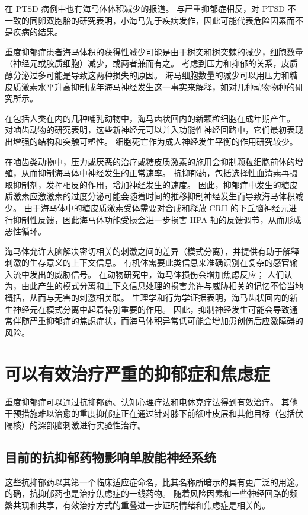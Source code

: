 在 PTSD 病例中也有海马体体积减少的报道。 与严重抑郁症相反，对 PTSD 不一致的同卵双胞胎的研究表明，小海马先于疾病发作，因此可能代表危险因素而不是疾病的结果。

重度抑郁症患者海马体积的获得性减少可能是由于树突和树突棘的减少，细胞数量（神经元或胶质细胞）减少，或两者兼而有之。 考虑到压力和抑郁的关系，皮质醇分泌过多可能是导致这两种损失的原因。 海马细胞数量的减少可以用压力和糖皮质激素水平升高抑制成年海马神经发生这一事实来解释，如对几种动物物种的研究所示。

在包括人类在内的几种哺乳动物中，海马齿状回内的新颗粒细胞在成年期产生。 对啮齿动物的研究表明，这些新神经元可以并入功能性神经回路中，它们最初表现出增强的结构和突触可塑性。 细胞死亡作为成人神经发生平衡的作用研究较少。

在啮齿类动物中，压力或厌恶的治疗或糖皮质激素的施用会抑制颗粒细胞前体的增殖，从而抑制海马体中神经发生的正常速率。 抗抑郁药，包括选择性血清素再摄取抑制剂，发挥相反的作用，增加神经发生的速度。 因此，抑郁症中发生的糖皮质激素应激激素的过度分泌可能会随着时间的推移抑制神经发生而导致海马体积减少。 由于海马体中的糖皮质激素受体需要对合成和释放 CRH 的下丘脑神经元进行抑制性反馈，因此海马体功能受损会进一步损害 HPA 轴的反馈调节，从而形成恶性循环。

海马体允许大脑解决密切相关的刺激之间的差异（模式分离），并提供有助于解释刺激的生存意义的上下文信息。 有机体需要此类信息来准确识别在复杂的感官输入流中发出的威胁信号。 在动物研究中，海马体损伤会增加焦虑反应； 人们认为，由此产生的模式分离和上下文信息处理的损害允许与威胁相关的记忆不恰当地概括，从而与无害的刺激相关联。 生理学和行为学证据表明，海马齿状回内的新生神经元在模式分离中起着特别重要的作用。 因此，抑制神经发生可能会导致通常伴随严重抑郁症的焦虑症状，而海马体积异常低可能会增加患创伤后应激障碍的风险。


\section{可以有效治疗严重的抑郁症和焦虑症}
重度抑郁症可以通过抗抑郁药、认知心理疗法和电休克疗法得到有效治疗。 其他干预措施难以治愈的重度抑郁症正在通过针对膝下前额叶皮层和其他目标（包括伏隔核）的深部脑刺激进行实验性治疗。

\subsection{目前的抗抑郁药物影响单胺能神经系统}
这些抗抑郁药以其第一个临床适应症命名，比其名称所暗示的具有更广泛的用途。 的确，抗抑郁药也是治疗焦虑症的一线药物。 随着风险因素和一些神经回路的频繁共现和共享，有效治疗方式的重叠进一步证明情绪和焦虑症是相关的。

